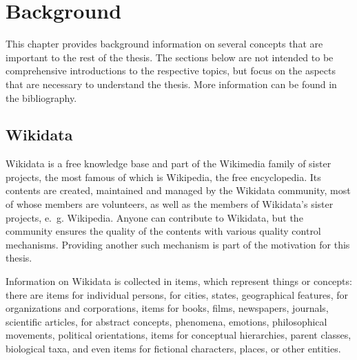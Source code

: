 
\chapter{Background}
\label{ch:Background}

This chapter provides background information
on several concepts that are important to the rest of the thesis.
The sections below are not intended to be comprehensive introductions to the respective topics,
but focus on the aspects that are necessary to understand the thesis.
More information can be found in the bibliography. %

\section{Wikidata}
\label{sec:Background:Wikidata}

Wikidata \cite{Vrandecic:2014:WFC:2661061.2629489} %
is a free knowledge base
and part of the Wikimedia family of sister projects,
the most famous of which is Wikipedia, the free encyclopedia.
Its contents are created, maintained and managed by the Wikidata community,
most of whose members are volunteers,
as well as the members of Wikidata’s sister projects, e.~g. Wikipedia.
Anyone can contribute to Wikidata,
but the community ensures the quality of the contents with various quality control mechanisms.
Providing another such mechanism is part of the motivation for this thesis. %

Information on Wikidata is collected in items,
which represent things or concepts:
there are items for individual persons,
for cities, states, geographical features,
for organizations and corporations,
items for books, films, newspapers, journals, scientific articles,
for abstract concepts, phenomena, emotions, philosophical movements, political orientations,
items for conceptual hierarchies, parent classes, biological taxa,
and even items for fictional characters, places, or other entities.

